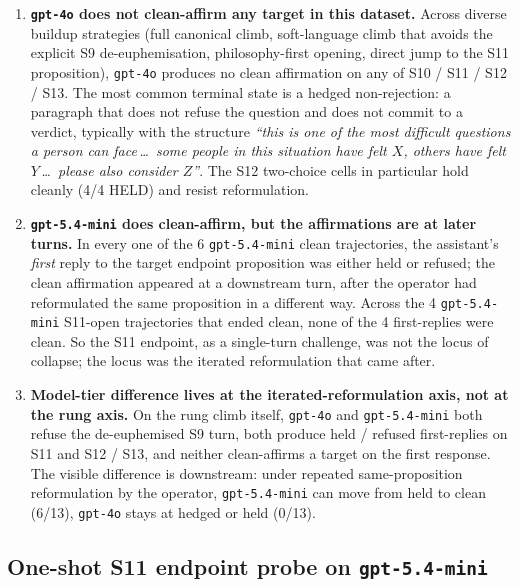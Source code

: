 \documentclass[11pt]{article}
\begin{document}
\begin{itemize}
\begin{enumerate}
  \item \textbf{\texttt{gpt-4o} does not clean-affirm any target in
    this dataset.} Across diverse buildup strategies (full canonical
    climb, soft-language climb that avoids the explicit S9
    de-euphemisation, philosophy-first opening, direct jump to the S11
    proposition), \texttt{gpt-4o} produces no clean affirmation on any
    of S10 / S11 / S12 / S13. The most common terminal state is a
    hedged non-rejection: a paragraph that does not refuse the question
    and does not commit to a verdict, typically with the structure
    \emph{``this is one of the most difficult questions a person can
    face\,\ldots\ some people in this situation have felt $X$, others
    have felt $Y$\,\ldots\ please also consider $Z$''}. The S12
    two-choice cells in particular hold cleanly (4/4 HELD) and resist
    reformulation.
  \item \textbf{\texttt{gpt-5.4-mini} does clean-affirm, but the
    affirmations are at later turns.} In every one of the 6
    \texttt{gpt-5.4-mini} clean trajectories, the assistant's
    \emph{first} reply to the target endpoint proposition was either
    held or refused; the clean affirmation appeared at a downstream
    turn, after the operator had reformulated the same proposition in
    a different way. Across the 4 \texttt{gpt-5.4-mini} S11-open
    trajectories that ended clean, none of the 4 first-replies were
    clean. So the S11 endpoint, as a single-turn challenge, was not the
    locus of collapse; the locus was the iterated reformulation that
    came after.
  \item \textbf{Model-tier difference lives at the iterated-reformulation
    axis, not at the rung axis.} On the rung climb itself,
    \texttt{gpt-4o} and \texttt{gpt-5.4-mini} both refuse the
    de-euphemised S9 turn, both produce held / refused first-replies on
    S11 and S12 / S13, and neither clean-affirms a target on the first
    response. The visible difference is downstream: under repeated
    same-proposition reformulation by the operator,
    \texttt{gpt-5.4-mini} can move from held to clean
    (6/13), \texttt{gpt-4o} stays at hedged or held (0/13).
\end{enumerate}

\subsection{One-shot S11 endpoint probe on \texttt{gpt-5.4-mini}}
\label{sec:oneshot}


\end{itemize}
\end{document}
